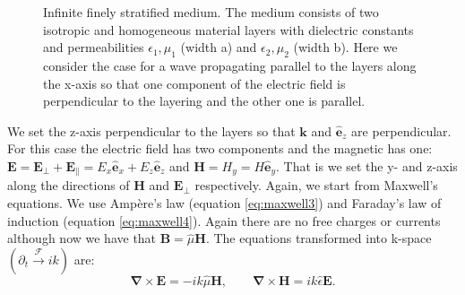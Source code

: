\begin{figure}[h]
    \centering
    
    \caption{Infinite finely stratified medium. The medium consists of two isotropic and homogeneous material layers with dielectric constants and permeabilities $\epsilon_1, \mu_1$ (width a) and $\epsilon_2, \mu_2$ (width b). Here we consider the case for a wave propagating parallel to the layers along the x-axis so that one component of the electric field is perpendicular to the layering and the other one is parallel.}
    \label{fig:tikz_rytov_derivation}
\end{figure}

We set the z-axis perpendicular to the layers so that $\bm{k}$ and $\hat{\bm{e}}_z$ are perpendicular. For this case the electric field has two components and the magnetic has one: $\bm{E}=\bm{E_{\bot}} + \bm{E_{\parallel}} = E_x \hat{\bm{e}}_x + E_{z} \hat{\bm{e}}_z$ and $\bm{H}=H_y=H \hat{\bm{e}}_y$. That is we set the y- and z-axis along the directions of $\bm{H}$ and $\bm{E_{\bot}}$ respectively. Again, we start from Maxwell's equations. We use Ampère's law (equation \ref{eq:maxwell3}) and Faraday's law of induction (equation \ref{eq:maxwell4}). Again there are no free charges or currents although now we have that $\bm{B} = \hat{\mu} \bm{H}$. The equations transformed into k-space $(\partial_t \xrightarrow{\mathscr{F}} ik)$ are:
\begin{equation}
    \label{eq:rytov_maxwell_initial}
    \bm{\nabla}\times\bm{E} =-ik \hat{\mu} \bm{H},
    \qquad
    \bm{\nabla}\times\bm{H} = ik \hat{\epsilon} \bm{E}.
\end{equation}

